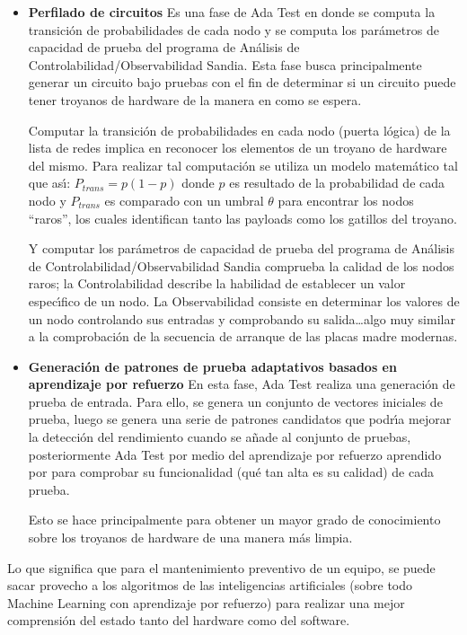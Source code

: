 \begin{itemize}
	\item \textbf{Perfilado de circuitos}
	      Es una fase de Ada Test en donde se computa la transici\'on de probabilidades
	      de cada nodo y se computa los par\'ametros de capacidad de prueba del programa
	      de An\'alisis de Controlabilidad/Observabilidad Sandia. Esta fase busca
	      principalmente generar un circuito bajo pruebas con el fin de determinar si
	      un circuito puede tener troyanos de hardware de la manera en como se espera.

	      Computar la transici\'on de probabilidades en cada nodo (puerta l\'ogica) de la
	      lista de redes implica en reconocer los elementos de un troyano de hardware
	      del mismo. Para realizar tal computaci\'on se utiliza un modelo matem\'atico tal
	      que as\'{\i}: $ P_{trans} = p(1-p) $ donde $ p $ es resultado de la probabilidad
	      de cada nodo y $ P_{trans} $ es comparado con un umbral $ \theta $ para
	      encontrar los nodos ``raros'', los cuales identifican tanto las payloads
	      como los gatillos del troyano.

	      Y computar los par\'ametros de capacidad de prueba del programa de An\'alisis de
	      Controlabilidad/Observabilidad Sandia comprueba la calidad de los nodos
	      raros; la Controlabilidad describe la habilidad de establecer un valor
	      espec\'{\i}fico de un nodo. La Observabilidad consiste en determinar los valores
	      de un nodo controlando sus entradas y comprobando su salida\dots algo muy
	      similar a la comprobaci\'on de la secuencia de arranque de las placas madre
	      modernas.
	\item \textbf{
		      Generaci\'on de patrones de prueba adaptativos basados en aprendizaje por
		      refuerzo}
	      En esta fase, Ada Test realiza una generaci\'on de prueba de entrada. Para
	      ello, se genera un conjunto de vectores iniciales de prueba, luego se
	      genera una serie de patrones candidatos que podr\'{\i}a mejorar la detecci\'on del
	      rendimiento cuando se a\~nade al conjunto de pruebas, posteriormente Ada Test
	      por medio del aprendizaje por refuerzo aprendido por \textcite{Janiesch2021}
	      para comprobar su funcionalidad (qu\'e tan alta es su calidad) de cada prueba.

	      Esto se hace principalmente para obtener un mayor grado de conocimiento
	      sobre los troyanos de hardware de una manera m\'as limpia.
\end{itemize}

Lo que significa que para el mantenimiento preventivo de un equipo, se puede
sacar provecho a los algoritmos de las inteligencias artificiales (sobre todo
Machine Learning con aprendizaje por refuerzo) para realizar una mejor
comprensi\'on del estado tanto del hardware como del software.

